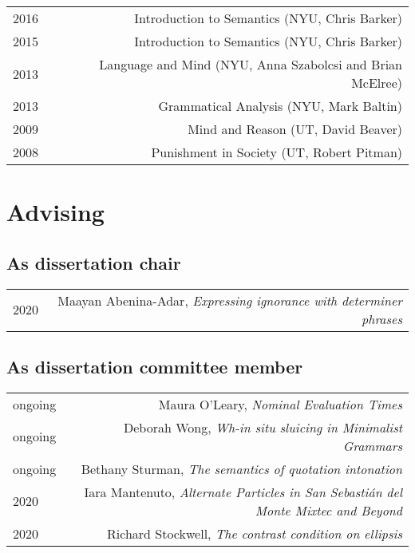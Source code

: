 \documentclass[12pt]{article}
\begin{document}
\begin{longtable}{LR}
  2016 & Introduction to Semantics (NYU, Chris Barker)
         \\
  2015 & Introduction to Semantics (NYU, Chris Barker)
         \\
  2013 & Language and Mind (NYU, Anna Szabolcsi and Brian McElree)
         \\
  2013 & Grammatical Analysis (NYU, Mark Baltin)
         \\
  2009 & Mind and Reason (UT, David Beaver)
         \\
  2008 & Punishment in Society (UT, Robert Pitman)
\end{longtable}


\medskip

\section*{Advising}

\subsection*{As dissertation chair}

\begin{longtable}{LR}
  2020    & Maayan Abenina-Adar, \textit{Expressing ignorance with determiner phrases}
\end{longtable}

\subsection*{As dissertation committee member}

\begin{longtable}{LR}
  ongoing & Maura O'Leary, \textit{Nominal Evaluation Times}\\
  ongoing & Deborah Wong, \textit{Wh-in situ sluicing in Minimalist Grammars}\\
  ongoing & Bethany Sturman, \textit{The semantics of quotation intonation}\\
  2020    & Iara Mantenuto, \textit{Alternate Particles in San Sebasti\'{a}n del Monte
            Mixtec and Beyond}\\
  2020    & Richard Stockwell, \textit{The contrast condition on ellipsis}
\end{longtable}
\end{document}
